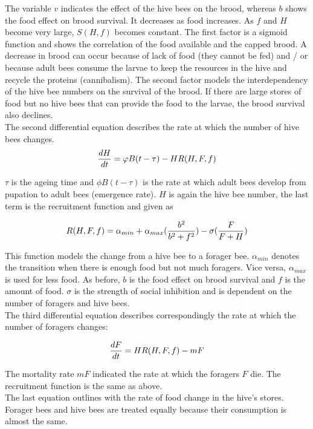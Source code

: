 	The variable $v$ indicates the effect of the hive bees on the brood, whereas $b$ shows the food effect on brood survival. It decreases as food increases. As $f$ and $H$ become very large, $S(H,f)$ becomes constant. The first factor is a sigmoid function and shows the correlation of the food available and the capped brood. A decrease in brood can occur because of lack of food (they cannot be fed) and / or because adult bees consume the larvae to keep the resources in the hive and recycle the proteins (cannibalism). The second factor models the interdependency of the hive bee numbers on the survival of the brood. If there are large stores of food but no hive bees that can provide the food to the larvae, the brood survival also declines.  
	\\
	The second differential equation describes the rate at which the number of hive bees changes.	
	\begin{equation}\label{eq:changeHiveBees}
		{dH \over dt}=\phi B(t-\tau)-HR(H,F,f)
	\end{equation}
	
	$\tau$ is the ageing time and $\phi B(t-\tau)$ is the rate at which adult bees develop from pupation to adult bees (emergence rate). $H$ is again the hive bee number, the last term is the recruitment function and given as
		
		\begin{equation}\label{eq:recruitmentFunction}
			R(H,F,f) = \alpha_{min} + \alpha_{max}({b^2 \over b^2+f^2})-\sigma({F \over F+H})
		\end{equation}
				
	This function models the change from a hive bee to a forager bee. $\alpha_{min}$ denotes the transition when there is enough food but not much foragers. Vice versa, $\alpha_{max}$ is used for less food. As before, $b$ is the food effect on brood survival and $f$ is the amount of food. $\sigma$ is the strength of social inhibition and is dependent on the number of foragers and hive bees.\\
	The third differential equation describes correspondingly the rate at which the number of foragers changes:
	
	\begin{equation}\label{eq:changeForagers}
		{dF \over dt} = HR(H,F,f)-m F
	\end{equation}
	
	The mortality rate $mF$ indicated the rate at which the foragers $F$ die. The recruitment function is the same as above.\\	
	The last equation outlines with the rate of food change in the hive's stores. Forager bees and hive bees are treated equally because their consumption is almost the same. 
	
